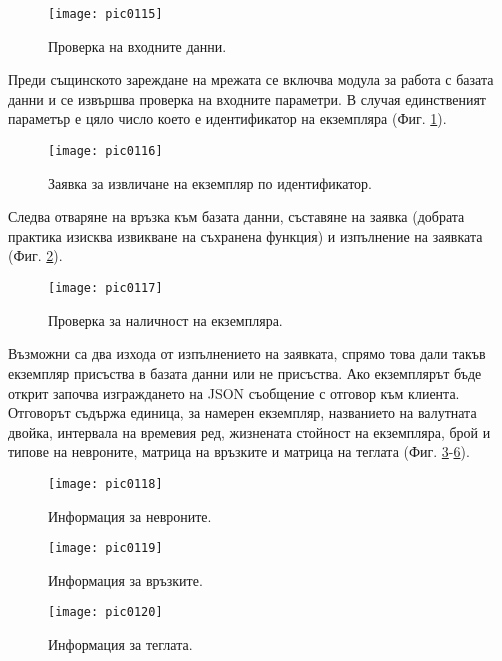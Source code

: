 \begin{figure}[h]
  \centering
  \texttt{[image: pic0115]}
  \caption{Проверка на входните данни.}
\label{fig:pic0115}
\end{figure}
\FloatBarrier

Преди същинското зареждане на мрежата се включва модула за работа с базата данни и се извършва проверка на входните параметри. В случая единственият параметър е цяло число което е идентификатор на екземпляра (Фиг. \ref{fig:pic0115}).

\begin{figure}[h]
  \centering
  \texttt{[image: pic0116]}
  \caption{Заявка за извличане на екземпляр по идентификатор.}
\label{fig:pic0116}
\end{figure}
\FloatBarrier

Следва отваряне на връзка към базата данни, съставяне на заявка (добрата практика изисква извикване на съхранена функция) и изпълнение на заявката (Фиг. \ref{fig:pic0116}). 

\begin{figure}[h]
  \centering
  \texttt{[image: pic0117]}
  \caption{Проверка за наличност на екземпляра.}
\label{fig:pic0117}
\end{figure}
\FloatBarrier

Възможни са два изхода от изпълнението на заявката, спрямо това дали такъв екземпляр присъства в базата данни или не присъства. Ако екземплярът бъде открит започва изграждането на JSON съобщение с отговор към клиента. Отговорът съдържа единица, за намерен екземпляр, названието на валутната двойка, интервала на времевия ред, жизнената стойност на екземпляра, брой и типове на невроните, матрица на връзките и матрица на теглата (Фиг. \ref{fig:pic0117}-\ref{fig:pic0120}).

\begin{figure}[h]
  \centering
  \texttt{[image: pic0118]}
  \caption{Информация за невроните.}
\label{fig:pic0118}
\end{figure}
\FloatBarrier

\begin{figure}[h]
  \centering
  \texttt{[image: pic0119]}
  \caption{Информация за връзките.}
\label{fig:pic0119}
\end{figure}
\FloatBarrier

\begin{figure}[h]
  \centering
  \texttt{[image: pic0120]}
  \caption{Информация за теглата.}
\label{fig:pic0120}
\end{figure}
\FloatBarrier


